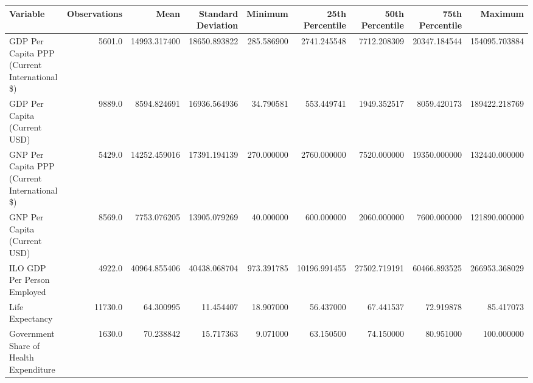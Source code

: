 \begin{tabular}{lrrrrrrrr}
\toprule
                                    Variable &  Observations &         Mean &  Standard Deviation &    Minimum &  25th Percentile &  50th Percentile &  75th Percentile &       Maximum \\
\midrule
GDP Per Capita PPP (Current International \$) & 5601.0 & 14993.317400 & 18650.893822 & 285.586900 & 2741.245548 & 7712.208309 & 20347.184544 & 154095.703884 \\
GDP Per Capita (Current USD) & 9889.0 & 8594.824691 & 16936.564936 & 34.790581 & 553.449741 & 1949.352517 & 8059.420173 & 189422.218769 \\
GNP Per Capita PPP (Current International \$) & 5429.0 & 14252.459016 & 17391.194139 & 270.000000 & 2760.000000 & 7520.000000 & 19350.000000 & 132440.000000 \\
GNP Per Capita (Current USD) & 8569.0 & 7753.076205 & 13905.079269 & 40.000000 & 600.000000 & 2060.000000 & 7600.000000 & 121890.000000 \\
ILO GDP Per Person Employed & 4922.0 & 40964.855406 & 40438.068704 & 973.391785 & 10196.991455 & 27502.719191 & 60466.893525 & 266953.368029 \\
Life Expectancy & 11730.0 & 64.300995 & 11.454407 & 18.907000 & 56.437000 & 67.441537 & 72.919878 & 85.417073 \\
Government Share of Health Expenditure & 1630.0 & 70.238842 & 15.717363 & 9.071000 & 63.150500 & 74.150000 & 80.951000 & 100.000000 \\
\bottomrule
\end{tabular}
